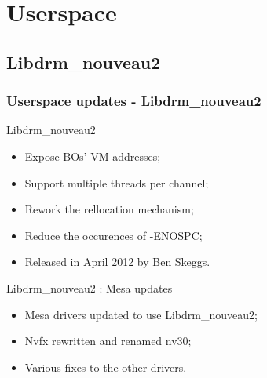 \documentclass[11pt,english,compress]{beamer}
\begin{document}
\section{Userspace}

\subsection{Libdrm\_nouveau2}
\begin{frame}
	\frametitle{Userspace updates - Libdrm\_nouveau2}

	\begin{block}{Libdrm\_nouveau2}
		\begin{itemize}
			\item Expose BOs' VM addresses;
			\item Support multiple threads per channel;
			\item Rework the rellocation mechanism;
			\item Reduce the occurences of -ENOSPC;
			\item Released in April 2012 by Ben Skeggs.
		\end{itemize}
	\end{block}

	\begin{block}{Libdrm\_nouveau2 : Mesa updates}
		\begin{itemize}
			\item Mesa drivers updated to use Libdrm\_nouveau2;
			\item Nvfx rewritten and renamed nv30;
			\item Various fixes to the other drivers.
		\end{itemize}
	\end{block}
\end{frame}
\end{document}
